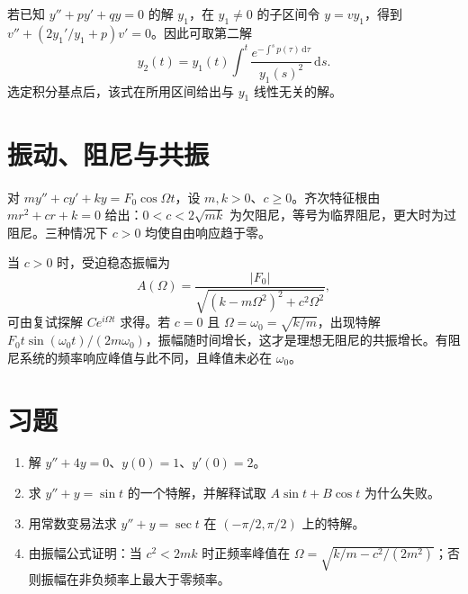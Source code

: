 若已知 $y''+py'+qy=0$ 的解 $y_1$，在 $y_1\ne0$ 的子区间令 $y=v y_1$，得到 $v''+(2y_1'/y_1+p)v'=0$。因此可取第二解
\[
 y_2(t)=y_1(t)\int^t\frac{e^{-\int^s p(\tau)\,\mathrm d\tau}}{y_1(s)^2}\,\mathrm ds.
\]
选定积分基点后，该式在所用区间给出与 $y_1$ 线性无关的解。

\section{振动、阻尼与共振}
对 $my''+cy'+ky=F_0\cos\Omega t$，设 $m,k>0$、$c\geq0$。齐次特征根由 $mr^2+cr+k=0$ 给出：$0<c<2\sqrt{mk}$ 为欠阻尼，等号为临界阻尼，更大时为过阻尼。三种情况下 $c>0$ 均使自由响应趋于零。

当 $c>0$ 时，受迫稳态振幅为
\[
 A(\Omega)=\frac{|F_0|}{\sqrt{(k-m\Omega^2)^2+c^2\Omega^2}},
\]
可由复试探解 $Ce^{i\Omega t}$ 求得。若 $c=0$ 且 $\Omega=\omega_0=\sqrt{k/m}$，出现特解 $F_0t\sin(\omega_0t)/(2m\omega_0)$，振幅随时间增长，这才是理想无阻尼的共振增长。有阻尼系统的频率响应峰值与此不同，且峰值未必在 $\omega_0$。

\section{习题}
\begin{enumerate}
 \item\label{ex:ode-constant} 解 $y''+4y=0$、$y(0)=1$、$y'(0)=2$。
 \item\label{ex:ode-resonance} 求 $y''+y=\sin t$ 的一个特解，并解释试取 $A\sin t+B\cos t$ 为什么失败。
 \item 用常数变易法求 $y''+y=\sec t$ 在 $(-\pi/2,\pi/2)$ 上的特解。
 \item 由振幅公式证明：当 $c^2<2mk$ 时正频率峰值在 $\Omega=\sqrt{k/m-c^2/(2m^2)}$；否则振幅在非负频率上最大于零频率。
\end{enumerate}

